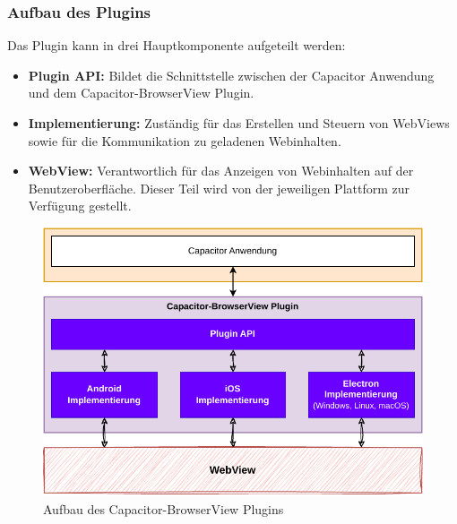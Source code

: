 \subsubsection{Aufbau des Plugins}

Das Plugin kann in drei Hauptkomponente aufgeteilt werden:

\begin{itemize}
  \item \textbf{Plugin API:} Bildet die Schnittstelle zwischen der Capacitor Anwendung und dem Capacitor-BrowserView Plugin.
  \item \textbf{Implementierung:} Zuständig für das Erstellen und Steuern von WebViews sowie für die Kommunikation zu geladenen Webinhalten.
  \item \textbf{WebView:}
  Verantwortlich für das Anzeigen von Webinhalten auf der Benutzeroberfläche.
  Dieser Teil wird von der jeweiligen Plattform zur Verfügung gestellt.
  \cite{android:api, ios:api, electron:docs}
\end{itemize}

\begin{figure}[H]
  \centering
  \includegraphics[width=\textwidth]{assets/03_Capacitor-BrowserView/02_Aufbau.drawio.pdf}
  \caption[Capacitor-BrowserView / Aufbau]{Aufbau des Capacitor-BrowserView Plugins}
\end{figure}
